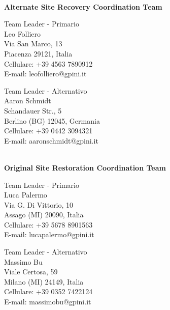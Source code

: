 \documentclass[12pt, a4paper, titlepage]{report}
\begin{document}
	\newpage
	\centerline{\textbf{\\Alternate Site Recovery Coordination Team}}
	\begin{paracol}{2}
		\setlength{\columnsep}{5em}
		\begin{leftcolumn}
			\begin{adjustwidth}{0.5cm}{}
				Team Leader - Primario \\
				Leo Folliero \\
				Via San Marco, 13\\ 
				Piacenza 29121, Italia
				\\Cellulare: +39 4563 7890912 \\
				E-mail:  leofolliero@gpini.it 
			\end{adjustwidth}
		\end{leftcolumn}
		\begin{rightcolumn}
			\begin{adjustwidth}{0.5cm}{}
				Team Leader - Alternativo \\
				Aaron Schmidt\\
				Schandauer Str., 5\\ 
				Berlino (BG) 12045, Germania \\
				Cellulare:  +39 0442 3094321 \\
				E-mail: aaronschmidt@gpini.it 
			\end{adjustwidth}
		\end{rightcolumn}
	\end{paracol}
	
	\vspace{0.5cm}
	\centerline{\textbf{\\Original Site Restoration Coordination Team}}
	\begin{paracol}{2}
		\setlength{\columnsep}{5em}
		\begin{leftcolumn}
			\begin{adjustwidth}{0.5cm}{}
				Team Leader - Primario \\
				Luca Palermo \\
				Via G. Di Vittorio, 10\\ 
				Assago (MI) 20090, Italia \\
				Cellulare:  +39 5678 8901563 \\
				E-mail:  lucapalermo@gpini.it 
			\end{adjustwidth}
		\end{leftcolumn}
		\begin{rightcolumn}
			\begin{adjustwidth}{0.5cm}{}
				Team Leader - Alternativo \\
				Massimo Bu\\
				Viale Certosa, 59\\ 
				Milano (MI) 24149, Italia \\
				Cellulare:  +39 0352 7422124 \\
				E-mail: massimobu@gpini.it 
			\end{adjustwidth}
		\end{rightcolumn}
	\end{paracol}
	
\end{document}
